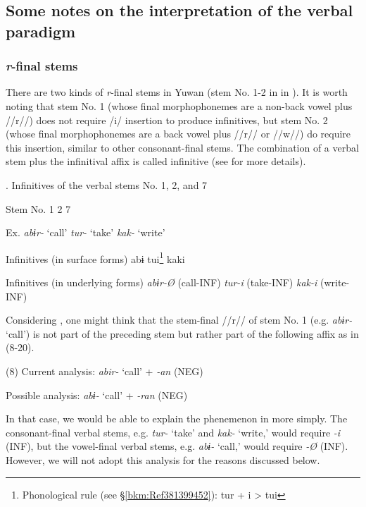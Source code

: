 \subsection{Some notes on the interpretation of the verbal paradigm}
\subsubsection{\textit{r}{}-final stems}

There are two kinds of \textit{r}{}-final stems in Yuwan (stem No. 1-2 in  in ). It is worth noting that stem No. 1 (whose final morphophonemes are a non-back vowel plus //r//) does not require /i/ insertion to produce infinitives, but stem No. 2 (whose final morphophonemes are a back vowel plus //r// or //w//) do require this insertion, similar to other consonant-final stems. The combination of a verbal stem plus the infinitival affix is called infinitive (see  for more details).

\begin{styleBeschriftung}
\textmd{}\textmd{. Infinitives of the verbal stems No. 1, 2, and 7}
\end{styleBeschriftung}

Stem No.  1    2    7

Ex.  \textit{abɨr-} ‘call’    \textit{tur-} ‘take’    \textit{kak-} ‘write’

Infinitives (in surface forms)  abɨ      tui\footnote{Phonological rule (see §\ref{bkm:Ref381399452}): tur + i > tui}      kaki  

Infinitives (in underlying forms)  \textit{abɨr-Ø}  (call-INF)    \textit{tur-i}  (take-INF)    \textit{kak-i}  (write-INF)

Considering , one might think that the stem-final //r// of stem No. 1 (e.g. \textit{abɨr-} ‘call’) is not part of the preceding stem but rather part of the following affix as in (8-20).

(8)  Current analysis:  \textit{abir-}  ‘call’  +  \textit{{}-an}  (NEG)

  Possible analysis:  \textit{abɨ-}  ‘call’  +  \textit{{}-ran}  (NEG)

In that case, we would be able to explain the phenemenon in  more simply. The consonant-final verbal stems, e.g. \textit{tur-} ‘take’ and \textit{kak-} ‘write,’ would require \textit{{}-i} (INF), but the vowel-final verbal stems, e.g. \textit{abɨ-} ‘call,’ would require \textit{{}-Ø} (INF). However, we will not adopt this analysis for the reasons discussed below.

